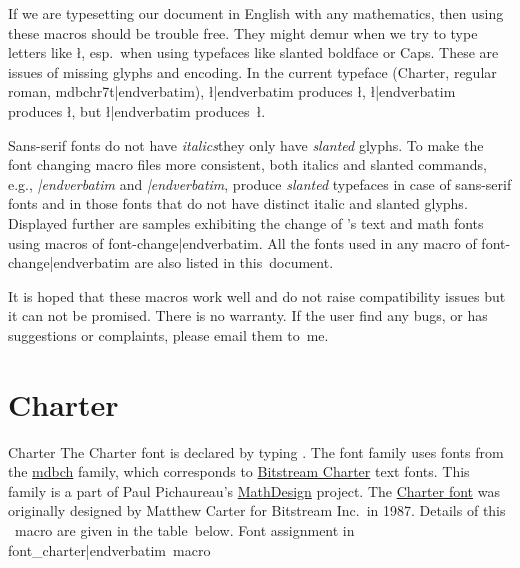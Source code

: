 {
If we are typesetting our document in English with any mathematics, then using these macros should be trouble free. They might demur when we try to type letters like \l, esp.\ when using typefaces like {\slbf slanted boldface\/} or {\caps Caps}. These are issues of missing glyphs and encoding. In the current typeface (Charter, regular roman, {\verbatim mdbchr7t|endverbatim}), {\color{brown}\verbatim\l|endverbatim} produces \l, {\color{brown}\verbatim\slbf \l|endverbatim} produces {\slbf \l}, but {\color{brown}\verbatim\caps\l|endverbatim} produces~{\caps \l}.





Sans-serif fonts do not have {\it italics}\emdash they only have {\sl slanted\/} glyphs. To make the font changing macro files more consistent, both italics and slanted commands, e.g., {\color{brown}\verbatim\it|endverbatim} and {\color{brown}\verbatim\sl|endverbatim}, produce {\sl slanted} typefaces in case of sans-serif fonts and in those fonts that do not have distinct italic and slanted glyphs. Displayed further are samples exhibiting the change of \capstex's text and math fonts using macros of {\color{brown}\verbatim font-change|endverbatim}. All the fonts used in any macro of {\color{brown}\verbatim font-change|endverbatim} are also listed in this~document.

It is hoped that these macros work well and do not raise compatibility issues but it can not be promised. There is no warranty. If the user find any bugs, or has suggestions or complaints, please email them to~me.



















\section{\sixteenbf\fontss Charter}{Charter}
\sample
\ii The Charter font is declared by typing {\color{brown}\verbatim}. The font family uses fonts from the \href{http://www.tex.ac.uk/tex-archive/help/Catalogue/entries/mathdesign-charter.html}{mdbch} family, which corresponds to \href{http://www.tex.ac.uk/tex-archive/help/Catalogue/entries/charter.html}{Bitstream Charter} text fonts. This family is a part of Paul Pichaureau's \href{http://www.tex.ac.uk/tex-archive/help/Catalogue/entries/mathdesign.html}{MathDesign} project. The \href{http://new.myfonts.com/fonts/bitstream/charter-bt-pro/}{Charter font} was originally designed by Matthew Carter for Bitstream Inc.\ in 1987. Details of this \capstex\ macro are given in the table~below.
\bs
\hfil{Font assignment in {\color{brown}\verbatim font_charter|endverbatim}~macro}\hfil

}
